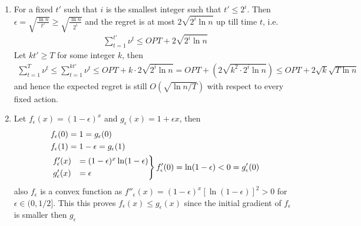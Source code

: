\documentclass[a4paper,12pt]{article}
\theoremstyle{definition}
\begin{document}
\begin{enumerate}
\item For a fixed $t'$ such that $i$ is the smallest integer such that $t'\leq2^i$. Then $\epsilon=\sqrt{\frac{\ln n}{t'}}\geq\sqrt{\frac{\ln n}{2^i}}$ and the regret is at most $2\sqrt{2^i\ln n}$ up till time $t$, i.e.
\begin{align*}
\sum_{t=1}^{t'}\nu^t \leq OPT + 2\sqrt{2^i\ln n}
\end{align*}
Let $kt'\geq T$ for some integer $k$, then
\begin{align*}
\sum_{t=1}^{T}\nu^t \leq\sum_{t=1}^{kt'}\nu^t \leq OPT + k\cdot 2\sqrt{2^i\ln n}=OPT + (2\sqrt{k^2\cdot 2^i\ln n}) \leq OPT + 2\sqrt{k}\sqrt{T\ln n}
\end{align*}
and hence the expected regret is still $O(\sqrt{\ln n/T})$ with respect to every fixed action.
\item Let $f_\epsilon(x)=(1-\epsilon)^x$ and $g_\epsilon(x)=1+\epsilon x$, then
\begin{align*}
&f_\epsilon(0) = 1 = g_\epsilon(0)\\
&f_\epsilon(1) = 1-\epsilon = g_\epsilon(1)\\
&\begin{rcases}
 f'_\epsilon(x)&=(1-\epsilon)^x\ln (1-\epsilon) \\
  g'_\epsilon(x)&=\epsilon \\
\end{rcases}f'_\epsilon(0) = \ln(1-\epsilon) < 0= g'_\epsilon(0)
\end{align*}
also $f_\epsilon$ is a convex function as $f''_\epsilon(x)=(1-\epsilon)^x\left[\ln (1-\epsilon)\right]^2>0$ for $\epsilon \in(0,1/2]$. This this proves $f_\epsilon(x)\leq g_\epsilon(x)$ since the initial gradient of $f_\epsilon$ is smaller then $g_\epsilon$ 


\end{enumerate}
\end{document}
